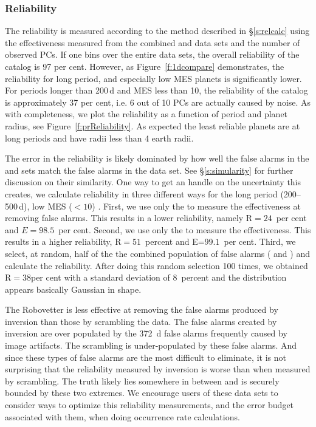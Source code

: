 \subsubsection{Reliability}
\label{s:reliability}
The reliability is measured according to the method described in \S\ref{s:relcalc} using the effectiveness measured from the combined \scrtce{} and \invtce{} data sets and the number of observed PCs.  If one bins over the entire data sets, the overall reliability of the catalog is 97 per cent. However, as Figure~\ref{f:1dcompare} demonstrates, the reliability for long period, and especially low MES planets is significantly lower.  For periods longer than 200\,d and MES less than 10, the reliability of the catalog is approximately 37 per cent, i.e. 6 out of 10 PCs are actually caused by noise. As with completeness, we plot the reliability as a function of period and planet radius, see Figure~\ref{f:prReliability}. As expected the least reliable planets are at long periods and have radii less than 4 earth radii. 

The error in the reliability is likely dominated by how well the false alarms in the \scrtce{} and \invtce{} sets match the false alarms in the \opstce{} data set. See \S\ref{s:simularity} for further discussion on their similarity.  One way to get an handle on the uncertainty this creates, we calculate reliability in three different ways for the long period (200--500\,d), low MES ($<10$) .  First, we use only the  to measure the effectiveness at removing false alarms. This results in a lower reliability, namely R$=24$~per cent and $E=98.5$~per cent. Second, we use only the  to measure the effectiveness. This results in a higher reliability, R$=51$~percent and E=$99.1$~per cent. Third, we select, at random, half of the the combined population of false alarms (\scrtce{} and \invtce{}) and calculate the reliability. After doing this random selection 100 times, we obtained R$=38$per cent with a standard deviation of 8~percent and the distribution appears basically Gaussian in shape.  

The Robovetter is less effective at removing the false alarms produced by inversion than those by scrambling the data. The false alarms created by inversion are over populated by the 372~d false alarms frequently caused by image artifacts.  The scrambling is under-populated by these false alarms. And since these types of false alarms are the most difficult to eliminate, it is not surprising that the reliability measured by inversion is worse than when measured by scrambling.  The truth likely lies somewhere in between and is securely bounded by these two extremes. We encourage users of these data sets to consider ways to optimize this reliability measurements, and the error budget associated with them, when doing occurrence rate calculations. 


